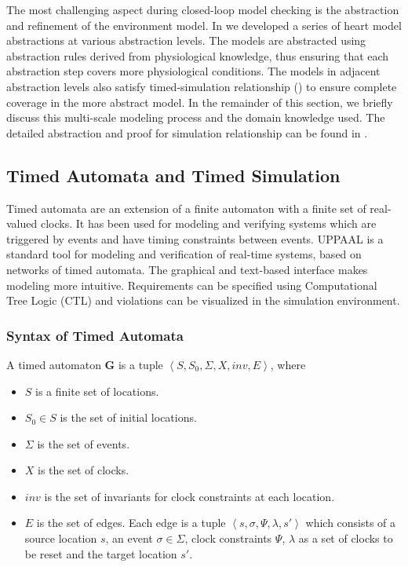The most challenging aspect during closed-loop model checking is the abstraction and refinement of the environment model. In \cite{STTT13} we developed a series of heart model abstractions at various abstraction levels. The models are abstracted using abstraction rules derived from physiological knowledge, thus ensuring that each abstraction step covers more physiological conditions. The models in adjacent abstraction levels also satisfy \textsf{timed-simulation} relationship (\cite{simulation}) to ensure complete coverage in the more abstract model. In the remainder of this section, we briefly discuss this multi-scale modeling process and the domain knowledge used. The detailed abstraction and proof for simulation relationship can be found in \cite{STTT13}.

\subsection{Timed Automata and Timed Simulation}
Timed automata \cite{timed_automata} are an extension of a finite automaton with a finite set of real-valued clocks. It has been used for modeling and verifying systems which are triggered by events and have timing constraints between events.  UPPAAL is a standard tool for modeling and verification of real-time systems, based on networks of timed automata. The graphical and text-based interface makes modeling more intuitive. Requirements can be specified using Computational Tree Logic (CTL) \cite{Clarke} and violations can be visualized in the simulation environment.
\subsubsection{Syntax of Timed Automata}
A timed automaton \textbf{G} is a tuple $\left\langle S,S_0,\Sigma,X,inv,E\right\rangle$, where

\begin{itemize}
	\item $S$ is a finite set of locations.
	\item $S_0\in S$ is the set of initial locations.
	\item $\Sigma$ is the set of events.
	\item $X$ is the set of clocks.
	\item $inv$ is the set of invariants for clock constraints at each location.
	\item $E$ is the set of edges. Each edge is a tuple $\left\langle s,\sigma,\Psi,\lambda,s'\right\rangle$ which consists of a source location $s$, an event $\sigma\in\Sigma$, clock constraints $\Psi$, $\lambda$ as a set of clocks to be reset and the target location $s'$.   
\end{itemize}

